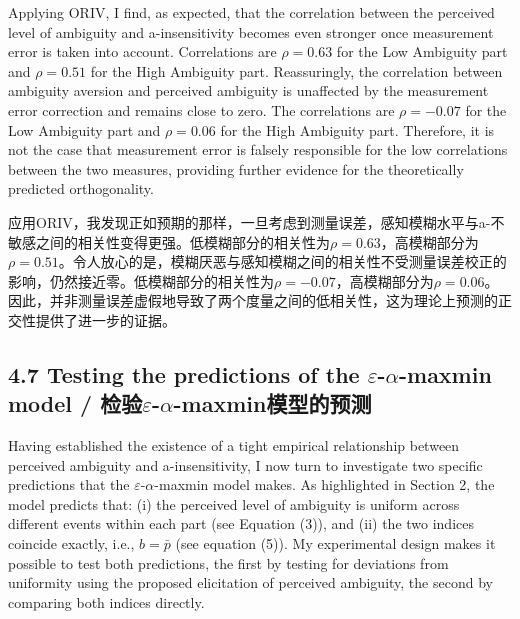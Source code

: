 \documentclass[12pt,a4paper]{article}
\newenvironment{original}
  {\par\medskip\noindent\color{black}\ignorespaces}
  {\par\medskip}
\newenvironment{translation}
  {\par\noindent\color{transblue}\ignorespaces}
  {\par\medskip\medskip}
\begin{document}
\begin{original}
Applying ORIV, I find, as expected, that the correlation between the perceived level of ambiguity and a-insensitivity becomes even stronger once measurement error is taken into account. Correlations are $\rho = 0.63$ for the Low Ambiguity part and $\rho = 0.51$ for the High Ambiguity part. Reassuringly, the correlation between ambiguity aversion and perceived ambiguity is unaffected by the measurement error correction and remains close to zero. The correlations are $\rho = -0.07$ for the Low Ambiguity part and $\rho = 0.06$ for the High Ambiguity part. Therefore, it is not the case that measurement error is falsely responsible for the low correlations between the two measures, providing further evidence for the theoretically predicted orthogonality.
\end{original}

\begin{translation}
应用ORIV，我发现正如预期的那样，一旦考虑到测量误差，感知模糊水平与a-不敏感之间的相关性变得更强。低模糊部分的相关性为$\rho = 0.63$，高模糊部分为$\rho = 0.51$。令人放心的是，模糊厌恶与感知模糊之间的相关性不受测量误差校正的影响，仍然接近零。低模糊部分的相关性为$\rho = -0.07$，高模糊部分为$\rho = 0.06$。因此，并非测量误差虚假地导致了两个度量之间的低相关性，这为理论上预测的正交性提供了进一步的证据。
\end{translation}

\subsection{4.7 Testing the predictions of the \texorpdfstring{$\varepsilon$-$\alpha$}{epsilon-alpha}-maxmin model / 检验\texorpdfstring{$\varepsilon$-$\alpha$}{epsilon-alpha}-maxmin模型的预测}

\begin{original}
Having established the existence of a tight empirical relationship between perceived ambiguity and a-insensitivity, I now turn to investigate two specific predictions that the $\varepsilon$-$\alpha$-maxmin model makes. As highlighted in Section 2, the model predicts that: (i) the perceived level of ambiguity is uniform across different events within each part (see Equation (3)), and (ii) the two indices coincide exactly, i.e., $b = \bar{p}$ (see equation (5)). My experimental design makes it possible to test both predictions, the first by testing for deviations from uniformity using the proposed elicitation of perceived ambiguity, the second by comparing both indices directly.
\end{original}
\end{document}

